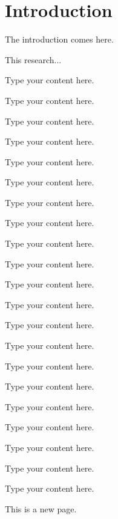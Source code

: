 %

\chapter{Introduction}

{
The introduction comes here.
}

This research...

Type your content here.

Type your content here.

Type your content here.

Type your content here.

Type your content here.

Type your content here.

Type your content here.

Type your content here.

Type your content here.

Type your content here.

Type your content here.

Type your content here.

Type your content here.

Type your content here.

Type your content here.

Type your content here.

Type your content here.

Type your content here.

Type your content here.

Type your content here.

Type your content here.

This is a new page. 

\chapterend


